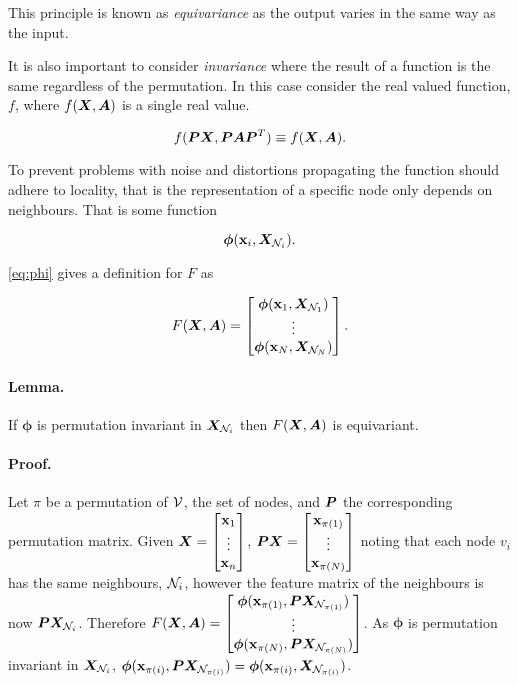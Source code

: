 This principle is known as \emph{equivariance} as the output varies in the same way as the input.

It is also important to consider \emph{invariance} where the result of a function is the same regardless of the permutation. In this case consider the real valued function, $f$, where $f({\bm{X}}, {\bm{A}})$ is a single real value.

\begin{equation}
    \label{eq:invar}
    f({\bm{P}}{\bm{X}}, {\bm{P}}{\bm{A}}{\bm{P}}^T) \equiv f({\bm{X}}, {\bm{A}}).
\end{equation}

To prevent problems with noise and distortions propagating the function should adhere to locality, that is the representation of a specific node only depends on neighbours.
That is some function

\begin{equation}
    \label{eq:phi}
    \bm{\phi}({\textbf{x}}_i, {\bm{X}}_{{\mathcal{N}}_i}).
\end{equation}

\ref{eq:phi} gives a definition for $F$ as

\begin{equation}
    F({\bm{X}}, {\bm{A}}) = \begin{bmatrix}\bm{\phi}({\textbf{x}}_1, {\bm{X}}_{{\mathcal{N}}_1}) \\ \vdots \\ \bm{\phi}({\textbf{x}}_N, {\bm{X}}_{{\mathcal{N}}_N})\end{bmatrix}.
\end{equation}

\paragraph{Lemma.}
If $\bm{\phi}$ is permutation invariant in ${\bm{X}}_{{\mathcal{N}}_i}$ then $F({\bm{X}}, {\bm{A}})$ is equivariant.

\paragraph{Proof.}
Let $\pi$ be a permutation of ${\mathcal{V}}$, the set of nodes, and ${\bm{P}}$ the corresponding permutation matrix.
Given ${\bm{X}} = \begin{bmatrix}{\textbf{x}}_1 \\ \vdots \\ {\textbf{x}}_n\end{bmatrix}$, ${\bm{P}}{\bm{X}} = \begin{bmatrix}{\textbf{x}}_{\pi(1)} \\ \vdots \\ {\textbf{x}}_{\pi(N)}\end{bmatrix}$ noting that each node $v_i$ has the same neighbours, ${\mathcal{N}}_i$, however the feature matrix of the neighbours is now ${\bm{P}}{\bm{X}}_{{\mathcal{N}}_i}$. Therefore $F({\bm{X}}, {\bm{A}}) = \begin{bmatrix}\bm{\phi}({\textbf{x}}_{\pi(1)}, {\bm{P}}{\bm{X}}_{{\mathcal{N}}_{\pi(1)}}) \\ \vdots \\ \bm{\phi}({\textbf{x}}_{\pi(N)}, {\bm{P}}{\bm{X}}_{{\mathcal{N}}_{\pi(N)}})\end{bmatrix}$. As $\bm{\phi}$ is permutation invariant in ${\bm{X}}_{{\mathcal{N}}_i}$, $\bm{\phi}({\textbf{x}}_{\pi(i)}, {\bm{P}}{\bm{X}}_{{\mathcal{N}}_{\pi(i)}}) = \bm{\phi}({\textbf{x}}_{\pi(i)}, {\bm{X}}_{{\mathcal{N}}_{\pi(i)}})$.

